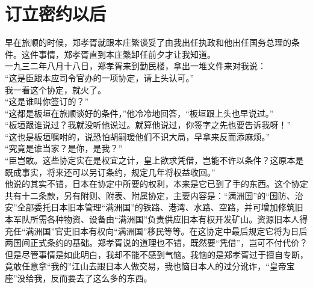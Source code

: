 \fancyhead[RO]{} %
\fancyhead[LE]{} %
\chapter*{订立密约以后}
\thispagestyle{empty}
早在旅顺的时候，郑孝胥就跟本庄繁谈妥了由我出任执政和他出任国务总理的条件。这件事情，郑孝胥直到本庄繁卸任前夕才让我知道。\\

一九三二年八月十八日，郑孝胥来到勤民楼，拿出一堆文件来对我说：\\

“这是臣跟本应司令官办的一项协定，请上头认可。”\\

我一看这个协定，就火了。\\

“这是谁叫你签订的？”\\

“这都是板垣在旅顺谈好的条件，”他冷冷地回答，“板垣跟上头也早说过。”\\

“板垣跟谁说过？我就没听他说过。就算他说过，你签字之先也要告诉我呀！”\\

“这也是板垣嘱咐的，说恐怕胡嗣瑗他们不识大局，早拿来反而添麻烦。”\\

“究竟是谁当家？是你，是我？”\\

“臣岂敢。这些协定实在是权宜之计，皇上欲求凭借，岂能不许以条件？这原本是既成事实，将来还可以另订条约，规定几年将权益收回。”\\

他说的其实不错，日本在协定中所要的权利，本来是它已到了手的东西。这个协定共有十二条款，另有附则、附表、附属协定，主要内容是：“满洲国”的“国防、治安”全部委托日本旧本管理“满洲国”的铁路、港湾、水路、空路，并可增加修筑旧本军队所需各种物资、设备由“满洲国”负责供应旧本有权开发矿山。资源旧本人得充任“满洲国”官吏旧本有权向“满洲国”移民等等。在这协定中最后规定它将为日后两国间正式条约的基础。郑孝胥说的道理也不错，既然要“凭借”，岂可不付代价？但是尽管事情是如此明白，我却不能不感到气恼。我恼的是郑孝胥过于擅自专断，竟敢任意拿“我的”江山去跟日本人做交易，我也恼日本人的过分讹诈，“皇帝宝座”没给我，反而要去了这么多的东西。\\


